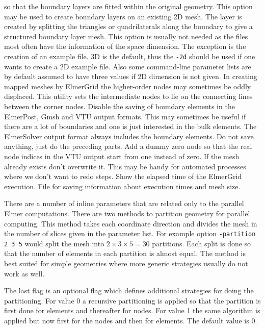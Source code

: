 so that the boundary layers are fitted within the original geometry.
%
This option may be used to create boundary layers on an existing 2D mesh.
The layer is created by splitting the triangles or quadrilaterals 
along the boundary to give a structured boundary layer mesh.
%
This option is usually not needed as the files most often have the information
of the space dimension. The exception is the creation of an example file.
3D is the default, thus the \texttt{-2d} should be used if one wants to create
a 2D example file. Also some command-line parameter lists are by default assumed to have 
three values if 2D dimension is not given.
%
In creating mapped meshes by ElmerGrid the higher-order nodes may sometimes be 
oddly displaced. This utility sets the intermediate nodes to lie on the connecting lines
between the corner nodes. 
%
Disable the saving of boundary elements in the ElmerPost, Gmsh and VTU
output formats. This may sometimes be useful if there are a lot of
boundaries and one is just interested in the bulk elements. The
ElmerSolver output format always includes the boundary elements.
%
Do not save anything, just do the preceding parts.
%
Add a dummy zero node so that the real node indices in the VTU output
start from one instead of zero.
%
If the mesh already exists don't overwrite it. This may be handy for automated
processes where we don't want to redo steps.
%
Show the elapsed time of the ElmerGrid execution.
%
File for saving information about execution times and mesh size.
\sifend
%

There are a number of inline parameters that are related only to the parallel Elmer computations.
%
\sifbegin
{} 
There are two methods to partition geometry for parallel computing. This
method takes each coordinate direction and divides the mesh in the number
of slices given in the parameter list. For example option
\texttt{-partition 2 3 5} would split the mesh into $2\times 3 \times 5 = 30$ partitions. 
Each split is done so that the number of elements in each partition
is almost equal. The method is best suited for simple geometries 
where more generic strategies usually do not work as well.

The last flag is an optional flag which defines additional strategies for doing the partitioning. 
For value 0 a recursive partitioning is applied so that the partition is first done for elements and
thereafter for nodes. For value 1 the same algorithm is applied but now first for the nodes and then for
elements. The default value is 0. 

